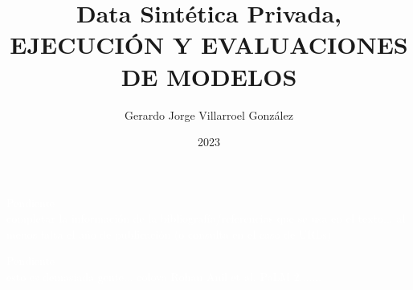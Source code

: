 \documentclass[upright, contnum]{umemoria}
\author{Gerardo Jorge Villarroel González}
\title{Data Sintética Privada, EJECUCIÓN Y EVALUACIONES DE MODELOS}
\date{2023}
\newcommand{\todo}[1]{%
\begin{tcolorbox}[colback=red!50!white,colframe=red!75!black,fonttitle=\bfseries]
\centering
\textcolor{white}{\Huge Pendiente} \\
\textcolor{white}{#1}
\end{tcolorbox}
}
\begin{document}
\frontmatter
\maketitle



 





\cleardoublepage

\tableofcontents
\listoftables %
\listoffigures %
\listoflistings

\mainmatter







%


\todo{completar la información de la bibliografía/referencias que se usa en el texto... al menos falta el año de publicación (o consulta en el caso de URLs)}
\todo{esto es demasiada gente... colova Rohan Anil et al. PaLM 2.......}



\begin{appendices}


\end{appendices}
\end{document}
